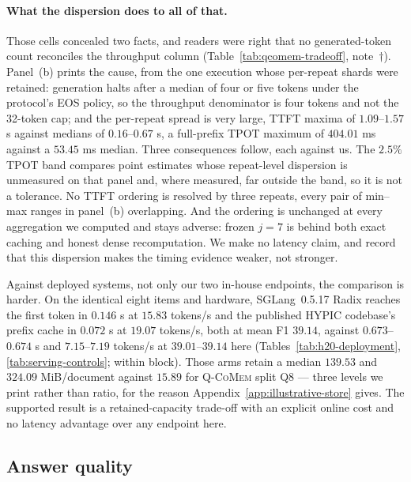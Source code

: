 \documentclass{article}
\newcommand{\qcomem}{\textsc{Q-CoMem}}
\begin{document}
\paragraph{What the dispersion does to all of that.}
Those cells concealed two facts, and readers were right that no generated-token
count reconciles the throughput column (Table~\ref{tab:qcomem-tradeoff},
note~$\dagger$).  Panel~(b) prints the cause,
from the one execution whose per-repeat shards were retained: generation halts
after a median of four or five tokens under the protocol's EOS policy, so the
throughput denominator is four tokens and not the 32-token cap; and the
per-repeat spread is very large, TTFT maxima of $1.09$--$1.57$ s against medians
of $0.16$--$0.67$ s, a full-prefix TPOT maximum of $404.01$ ms against a $53.45$
ms median.  Three consequences follow, each against us.  The $2.5\%$ TPOT band compares
point estimates whose repeat-level dispersion is unmeasured on that panel and,
where measured, far outside the band, so it is not a tolerance.  No TTFT ordering
is resolved by three repeats, every pair of min--max ranges in panel~(b)
overlapping.  And the ordering is unchanged at every aggregation we computed and
stays adverse: frozen $j=7$ is behind both exact caching and honest dense
recomputation.  We make no latency claim, and record that this dispersion makes
the timing evidence weaker, not stronger.

Against deployed systems, not only our two in-house endpoints, the comparison is
harder.  On the identical eight items and hardware, SGLang~0.5.17 Radix reaches
the first token in $0.146$ s at $15.83$ tokens/s and the published HYPIC
codebase's prefix cache in $0.072$ s at $19.07$ tokens/s, both at mean F1
$39.14$, against $0.673$--$0.674$ s and $7.15$--$7.19$ tokens/s at
$39.01$--$39.14$ here (Tables~\ref{tab:h20-deployment},
\ref{tab:serving-controls}; within block).  Those arms retain a median $139.53$
and $324.09$ MiB/document against $15.89$ for \qcomem{} split Q8 --- three levels
we print rather than ratio, for the reason
Appendix~\ref{app:illustrative-store} gives.  The supported result is a
retained-capacity trade-off with an explicit online cost and no latency
advantage over any endpoint here.


\subsection{Answer quality}
\label{sec:quality}
\end{document}
